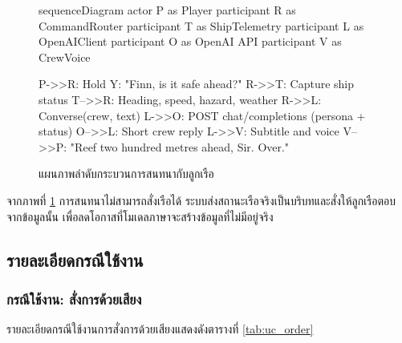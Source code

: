 \begin{figure}[!htbp]
\centering
\begin{mermaid}
sequenceDiagram
    actor P as Player
    participant R as CommandRouter
    participant T as ShipTelemetry
    participant L as OpenAIClient
    participant O as OpenAI API
    participant V as CrewVoice

    P->>R: Hold Y: "Finn, is it safe ahead?"
    R->>T: Capture ship status
    T-->>R: Heading, speed, hazard, weather
    R->>L: Converse(crew, text)
    L->>O: POST chat/completions (persona + status)
    O-->>L: Short crew reply
    L->>V: Subtitle and voice
    V-->>P: "Reef two hundred metres ahead, Sir. Over."
\end{mermaid}
\caption{แผนภาพลำดับกระบวนการสนทนากับลูกเรือ}
\label{fig:seq_chat}
\end{figure}

จากภาพที่ \ref{fig:seq_chat} การสนทนาไม่สามารถสั่งเรือได้ ระบบส่งสถานะเรือจริงเป็นบริบทและสั่งให้ลูกเรือตอบจากข้อมูลนั้น เพื่อลดโอกาสที่โมเดลภาษาจะสร้างข้อมูลที่ไม่มีอยู่จริง

\subsection{รายละเอียดกรณีใช้งาน}

\subsubsection{กรณีใช้งาน: สั่งการด้วยเสียง}

รายละเอียดกรณีใช้งานการสั่งการด้วยเสียงแสดงดังตารางที่ \ref{tab:uc_order}

